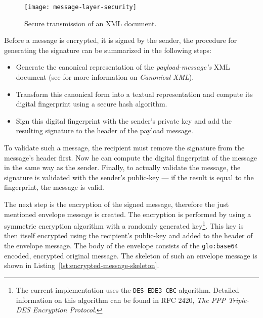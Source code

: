 \begin{figure}[ht]
  \centering
  \texttt{[image: message-layer-security]}
  \caption[Message Layer Security]{Secure transmission of an XML document.}
  \label{fig:net-mls}
\end{figure}

Before a message  is encrypted, it is signed by  the sender, the procedure
for generating the signature can be summarized in the following steps:

\begin{itemize}
\item     Generate     the     canonical     representation     of     the
  \emph{payload-message's} XML document (see \cite{canonical-xml} for more
  information on \emph{Canonical XML}).
\item  Transform this  canonical form  into a  textual  representation and
  compute its digital fingerprint using a secure hash algorithm.
\item Sign this digital fingerprint  with the sender's private key and add
  the resulting signature to the header of the payload message.
\end{itemize}

To validate such  a message, the recipient must  remove the signature from
the message's header first. Now  he can compute the digital fingerprint of
the message in the same way  as the sender.  Finally, to actually validate
the message, the  signature is validated with the  sender's public-key ---
if the result is equal to the fingerprint, the message is valid.

The next step is the encryption  of the signed message, therefore the just
mentioned  envelope message is  created.  The  encryption is  performed by
using  a   symmetric  encryption  algorithm  with   a  randomly  generated
key\footnote{The  current  implementation  uses the  \texttt{DES-EDE3-CBC}
  algorithm.  Detailed information  on this algorithm can be  found in RFC
  $2420$, \emph{The  PPP Triple-DES  Encryption Protocol}.}.  This  key is
then itself  encrypted using the  recipient's public-key and added  to the
header of the envelope message.  The  body of the envelope consists of the
\texttt{\gls{glo:base64}}   encoded,  encrypted  original   message.   The
skeleton    of     such    an    envelope    message     is    shown    in
Listing~\ref{lst:encrypted-message-skeleton}.

